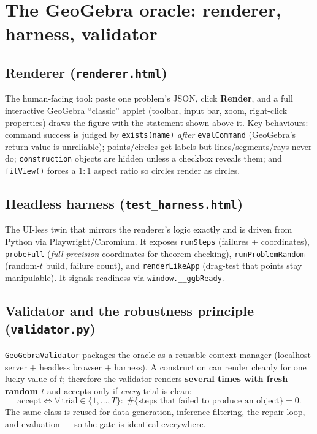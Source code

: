 \documentclass[11pt]{article}
\newcommand{\code}[1]{\texttt{\small #1}}
\begin{document}
\section{The GeoGebra oracle: renderer, harness, validator}
\label{sec:oracle}

\subsection{Renderer (\texttt{renderer.html})}
The human-facing tool: paste one problem's JSON, click \textbf{Render}, and a
full interactive GeoGebra ``classic'' applet (toolbar, input bar, zoom,
right-click properties) draws the figure with the statement shown above it. Key
behaviours: command success is judged by \code{exists(name)} \emph{after}
\code{evalCommand} (GeoGebra's return value is unreliable); points/circles get
labels but lines/segments/rays never do; \code{construction} objects are hidden
unless a checkbox reveals them; and \code{fitView()} forces a $1{:}1$ aspect
ratio so circles render as circles.

\subsection{Headless harness (\texttt{test\_harness.html})}
The UI-less twin that mirrors the renderer's logic exactly and is driven from
Python via Playwright/Chromium. It exposes \code{runSteps} (failures +
coordinates), \code{probeFull} (\emph{full-precision} coordinates for theorem
checking), \code{runProblemRandom} (random-$t$ build, failure count), and
\code{renderLikeApp} (drag-test that points stay manipulable). It signals
readiness via \code{window.\_\_ggbReady}.

\subsection{Validator and the robustness principle (\texttt{validator.py})}
\code{GeoGebraValidator} packages the oracle as a reusable context manager
(localhost server $+$ headless browser $+$ harness). A construction can render
cleanly for one lucky value of $t$; therefore the validator renders
\textbf{several times with fresh random $t$} and accepts only if \emph{every}
trial is clean:
\[
\text{accept} \iff \forall\, \text{trial}\in\{1,\dots,T\}:\;
\#\{\text{steps that failed to produce an object}\} = 0 .
\]
The same class is reused for data generation, inference filtering, the repair
loop, and evaluation --- so the gate is identical everywhere.
\end{document}
